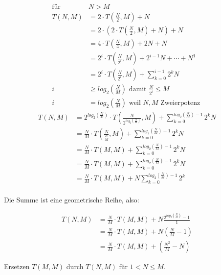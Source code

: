 \documentclass[parskip=half,a4paper]{scrartcl}
\begin{document}
\begin{equation*}
\begin{aligned}
    \text{für } & N > M \\
    T(N, M) & =  2 \cdot T(\frac{N}{2}, M) + N\\
    & =  2 \cdot (2 \cdot T(\frac{N}{2}, M) + N) + N\\
    & =  4 \cdot T(\frac{N}{4}, M) + 2N + N\\
    & =  2^i \cdot T(\frac{N}{2^i}, M) + 2^{i-1}N + \cdots + N^{1}\\
    & =  2^i \cdot T(\frac{N}{2^i}, M) + \sum_{k=0}^{i-1} 2^kN \\
    i & \ge log_2(\frac{N}{M}) \text{ damit } \frac{N}{2^i} \le M \\
    i & = log_2(\frac{N}{M}) \text{ weil $N,M$ Zweierpotenz }
\end{aligned}
\end{equation*}
\begin{equation*}
\begin{aligned}
    T(N, M) & =  2^{log_2(\frac{N}{M})} \cdot T(\frac{N}{2^{log_2(\frac{N}{M})}}, M) + \sum_{k=0}^{log_2(\frac{N}{M})-1} 2^kN \\
    & =  \frac{N}{M} \cdot T(\frac{N}{\frac{N}{M}}, M) + \sum_{k=0}^{log_2(\frac{N}{M})-1} 2^kN \\
    & =  \frac{N}{M} \cdot T(M, M) + \sum_{k=0}^{log_2(\frac{N}{M})-1} 2^kN \\
    & =  \frac{N}{M} \cdot T(M, M) + \sum_{k=0}^{log_2(\frac{N}{M})-1} 2^kN \\
    & =  \frac{N}{M} \cdot T(M, M) + N \sum_{k=0}^{log_2(\frac{N}{M})-1} 2^k \\
\end{aligned}
\end{equation*}
\begin{center}
Die Summe ist eine geometrische Reihe, also:
\end{center}
\begin{equation*}
\begin{aligned}
    T(N, M) & =  \frac{N}{M} \cdot T(M, M) + N \frac{2^{log_2(\frac{N}{M})} - 1}{1} \\
    & =  \frac{N}{M} \cdot T(M, M) + N (\frac{N}{M} - 1) \\
    & =  \frac{N}{M} \cdot T(M, M) + (\frac{N^2}{M} - N)
\end{aligned}
\end{equation*}

\begin{center}
Ersetzen $T(M,M)$ durch $T(N,M)$ für $1 < N \le M$.
\end{center}
\end{document}
